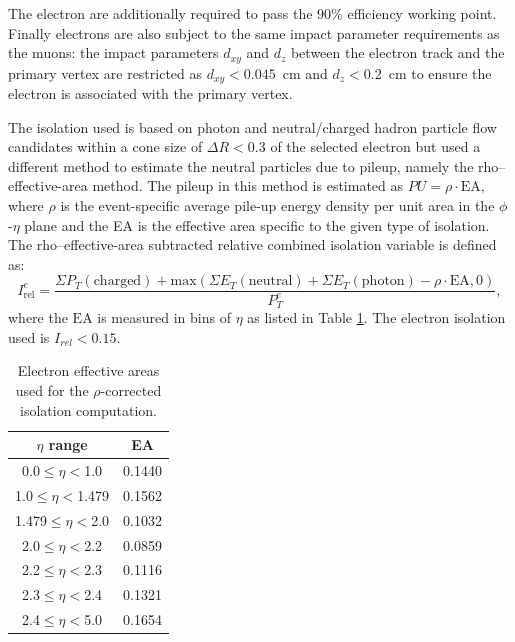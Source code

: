 The electron are additionally required to pass the 90\% efficiency working point. Finally electrons are also subject to the same impact parameter requirements as the
muons: the impact parameters $d_{xy}$ and $d_{z}$ between the electron track 
and the primary vertex are restricted as $d_{xy}<0.045$~cm and $d_{z}<0.2$~cm to
ensure the electron is associated with the primary vertex.

The isolation used is based on photon and neutral/charged hadron particle flow
candidates within a cone size of $\Delta R<0.3$ of the selected electron but
used a different method to estimate the neutral particles due to pileup, namely
the rho--effective-area method. The pileup in this method is estimated as
$PU=\rho\cdot\text{EA}$, where $\rho$ is the event-specific average pile-up
energy density per unit area in the $\phi$-$\eta$ plane and the EA is the
effective area specific to the given type of isolation. The rho--effective-area
subtracted relative combined isolation variable is defined as:
\begin{equation}
\label{eqn:electron_reliso_rho} 
I_{\text{rel}}^{e} = \frac{\Sigma
    P_{T}(\text{charged}) + \mathrm{max}(\Sigma E_{T}(\text{neutral}) + \Sigma
E_{T}(\text{photon}) - \rho\cdot\text{EA},0)}{P_{T}^{e}}, \end{equation} where
the $\text{EA}$ is measured in bins of $\eta$ as listed in Table
\ref{tab:EleEA}. The electron isolation used is $I_{rel}<0.15$. 

\begin{table}[htb]
\begin{center}
{\footnotesize
\begin{tabular}{|c|c|}
\hline
$\eta$ range & EA \\
\hline
0.0$\leq\eta<$1.0   &  0.1440 \\
1.0$\leq\eta<$1.479 &  0.1562 \\
1.479$\leq\eta<$2.0 &  0.1032 \\
2.0$\leq\eta<$2.2   &  0.0859 \\
2.2$\leq\eta<$2.3   &  0.1116 \\
2.3$\leq\eta<$2.4   &  0.1321 \\
2.4$\leq\eta<$5.0   &  0.1654 \\
\hline
\end{tabular}
} %
\end{center}
\caption{
 Electron effective areas used for the $\rho$-corrected isolation computation.
}
\label{tab:EleEA}
\end{table}

